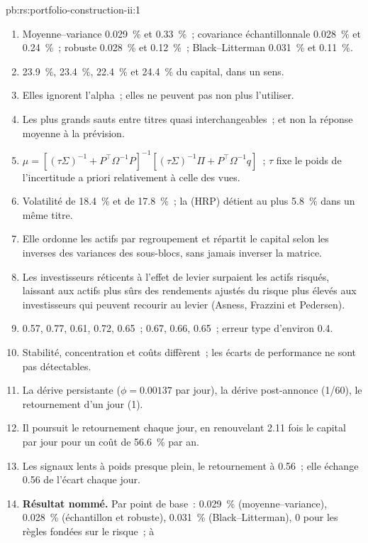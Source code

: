 \begin{solution}{pb:rs:portfolio-construction-ii:1}
\begin{enumerate}
\item Moyenne--variance 0.029~\% et 0.33~\%~; covariance échantillonnale 0.028~\% et 0.24~\%~; robuste 0.028~\% et 0.12~\%~; Black--Litterman 0.031~\% et 0.11~\%.
\item 23.9~\%, 23.4~\%, 22.4~\% et 24.4~\% du capital, dans un sens.
\item Elles ignorent l'alpha~; elles ne peuvent pas non plus l'utiliser.
\item Les plus grands sauts entre titres quasi interchangeables~; et non la réponse moyenne à la prévision.
\item $\mu = [(\tau\Sigma)^{-1} + P^\top\Omega^{-1}P]^{-1}[(\tau\Sigma)^{-1}\Pi + P^\top\Omega^{-1}q]$~; $\tau$ fixe le poids de l'incertitude a priori relativement à celle des vues.
\item Volatilité de 18.4~\% et de 17.8~\%~; la  (HRP) détient au plus 5.8~\% dans un même titre.
\item Elle ordonne les actifs par regroupement et répartit le capital selon les inverses des variances des sous-blocs, sans jamais inverser la matrice.
\item Les investisseurs réticents à l'effet de levier surpaient les actifs risqués, laissant aux actifs plus sûrs des rendements ajustés du risque plus élevés aux investisseurs qui peuvent recourir au levier (Asness, Frazzini et
Pedersen).
\item 0.57, 0.77, 0.61, 0.72, 0.65~; 0.67, 0.66, 0.65~; erreur type d'environ 0.4.
\item Stabilité, concentration et coûts diffèrent~; les écarts de performance ne sont pas détectables.
\item La dérive persistante ($\phi = 0.00137$ par jour), la dérive post-annonce (1/60), le retournement d'un jour (1).
\item Il poursuit le retournement chaque jour, en renouvelant 2.11 fois le capital par jour pour un coût de 56.6~\% par an.
\item Les signaux lents à poids presque plein, le retournement à 0.56~; elle échange 0.56 de l'écart chaque jour.
\item \textbf{Résultat nommé.} Par point de base~: 0.029~\% (moyenne--variance), 0.028~\% (échantillon et robuste), 0.031~\% (Black--Litterman), 0 pour les règles fondées sur le risque~; à

\end{enumerate}
\end{solution}
